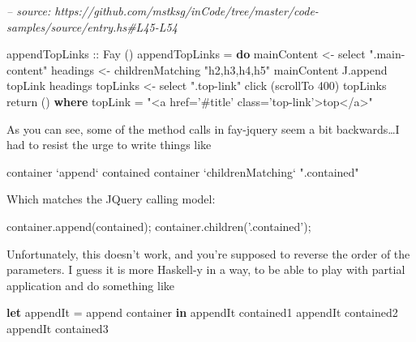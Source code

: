 \documentclass[]{article}
\newenvironment{Shaded}{}{}
\newcommand{\AttributeTok}[1]{\textcolor[rgb]{0.49,0.56,0.16}{#1}}
\newcommand{\CommentTok}[1]{\textcolor[rgb]{0.38,0.63,0.69}{\textit{#1}}}
\newcommand{\DataTypeTok}[1]{\textcolor[rgb]{0.56,0.13,0.00}{#1}}
\newcommand{\DecValTok}[1]{\textcolor[rgb]{0.25,0.63,0.44}{#1}}
\newcommand{\FunctionTok}[1]{\textcolor[rgb]{0.02,0.16,0.49}{#1}}
\newcommand{\KeywordTok}[1]{\textcolor[rgb]{0.00,0.44,0.13}{\textbf{#1}}}
\newcommand{\NormalTok}[1]{#1}
\newcommand{\OperatorTok}[1]{\textcolor[rgb]{0.40,0.40,0.40}{#1}}
\newcommand{\OtherTok}[1]{\textcolor[rgb]{0.00,0.44,0.13}{#1}}
\newcommand{\StringTok}[1]{\textcolor[rgb]{0.25,0.44,0.63}{#1}}
\newcommand{\VariableTok}[1]{\textcolor[rgb]{0.10,0.09,0.49}{#1}}
\begin{document}
\begin{Shaded}
\begin{Highlighting}[]
\CommentTok{-- source: https://github.com/mstksg/inCode/tree/master/code-samples/source/entry.hs#L45-L54}

\OtherTok{appendTopLinks ::} \DataTypeTok{Fay}\NormalTok{ ()}
\NormalTok{appendTopLinks }\FunctionTok{=} \KeywordTok{do}
\NormalTok{  mainContent }\OtherTok{<-}\NormalTok{ select }\StringTok{".main-content"}
\NormalTok{  headings }\OtherTok{<-}\NormalTok{ childrenMatching }\StringTok{"h2,h3,h4,h5"}\NormalTok{ mainContent}
\NormalTok{  J.append topLink headings}
\NormalTok{  topLinks }\OtherTok{<-}\NormalTok{ select }\StringTok{".top-link"}
\NormalTok{  click (scrollTo }\DecValTok{400}\NormalTok{) topLinks}
\NormalTok{  return ()}
  \KeywordTok{where}
\NormalTok{    topLink }\FunctionTok{=} \StringTok{"<a href='#title' class='top-link'>top</a>"}
\end{Highlighting}
\end{Shaded}

As you can see, some of the method calls in fay-jquery seem a bit
backwards\ldots{}I had to resist the urge to write things like

\begin{Shaded}
\begin{Highlighting}[]
\NormalTok{container }\OtherTok{`append`}\NormalTok{ contained}
\NormalTok{container }\OtherTok{`childrenMatching`} \StringTok{".contained"}
\end{Highlighting}
\end{Shaded}

Which matches the JQuery calling model:

\begin{Shaded}
\begin{Highlighting}[]
\VariableTok{container}\NormalTok{.}\AttributeTok{append}\NormalTok{(contained)}\OperatorTok{;}
\VariableTok{container}\NormalTok{.}\AttributeTok{children}\NormalTok{(}\StringTok{'.contained'}\NormalTok{)}\OperatorTok{;}
\end{Highlighting}
\end{Shaded}

Unfortunately, this doesn't work, and you're supposed to reverse the order of
the parameters. I guess it is more Haskell-y in a way, to be able to play with
partial application and do something like

\begin{Shaded}
\begin{Highlighting}[]
\KeywordTok{let}
\NormalTok{  appendIt }\FunctionTok{=}\NormalTok{ append container}
\KeywordTok{in}
\NormalTok{  appendIt contained1}
\NormalTok{  appendIt contained2}
\NormalTok{  appendIt contained3}
\end{Highlighting}
\end{Shaded}
\end{document}
